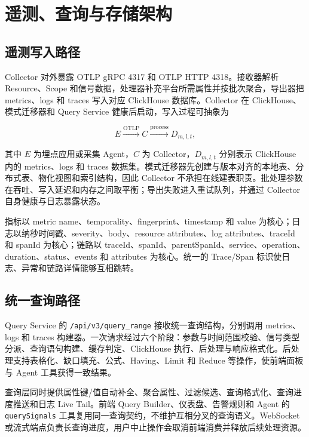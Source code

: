 \documentclass[conference,10pt]{IEEEtran}
\newcommand{\code}[1]{\texttt{#1}}
\begin{document}
\section{遥测、查询与存储架构}

\subsection{遥测写入路径}

Collector 对外暴露 OTLP gRPC 4317 和 OTLP HTTP 4318。接收器解析 Resource、Scope 和信号数据，处理器补充平台所需属性并按批次聚合，导出器把 metrics、logs 和 traces 写入对应 ClickHouse 数据库。Collector 在 ClickHouse、模式迁移器和 Query Service 健康后启动，写入过程可抽象为

\begin{equation}
  E \xrightarrow{\mathrm{OTLP}} C \xrightarrow{\mathrm{process}} D_{m,l,t},
\end{equation}

其中 $E$ 为埋点应用或采集 Agent，$C$ 为 Collector，$D_{m,l,t}$ 分别表示 ClickHouse 内的 metrics、logs 和 traces 数据集。模式迁移器先创建与版本对齐的本地表、分布式表、物化视图和索引结构，因此 Collector 不承担在线建表职责。批处理参数在吞吐、写入延迟和内存之间取平衡；导出失败进入重试队列，并通过 Collector 自身健康与日志暴露状态。

指标以 metric name、temporality、fingerprint、timestamp 和 value 为核心；日志以纳秒时间戳、severity、body、resource attributes、log attributes、traceId 和 spanId 为核心；链路以 traceId、spanId、parentSpanId、service、operation、duration、status、events 和 attributes 为核心。统一的 Trace/Span 标识使日志、异常和链路详情能够互相跳转。

\subsection{统一查询路径}

Query Service 的 \code{/api/v3/query\_range} 接收统一查询结构，分别调用 metrics、logs 和 traces 构建器。一次请求经过六个阶段：参数与时间范围校验、信号类型分派、查询语句构建、缓存判定、ClickHouse 执行、后处理与响应格式化。后处理支持表格化、缺口填充、公式、Having、Limit 和 Reduce 等操作，使前端面板与 Agent 工具获得一致结果。

查询层同时提供属性键/值自动补全、聚合属性、过滤候选、查询格式化、查询进度推送和日志 Live Tail。前端 Query Builder、仪表盘、告警规则和 Agent 的 \code{querySignals} 工具复用同一查询契约，不维护互相分叉的查询语义。WebSocket 或流式端点负责长查询进度，用户中止操作会取消前端消费并释放后续处理资源。
\end{document}
